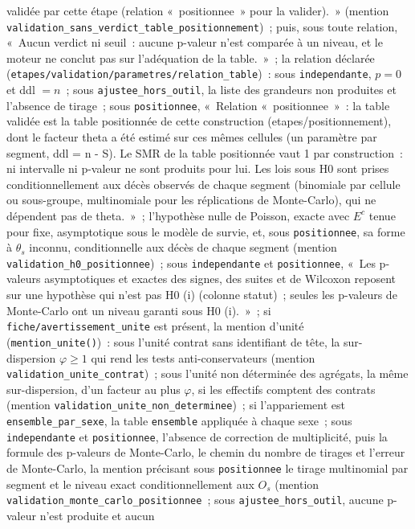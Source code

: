 \documentclass[a4paper,11pt]{article}
\newcommand{\code}[1]{\texttt{\small #1}}
\begin{document}
validée par cette étape (relation «~positionnee~» pour la valider).~»
(mention \code{validation\_sans\_verdict\_table\_positionnement})~;
puis, sous toute relation, «~Aucun verdict ni seuil~: aucune p-valeur
n'est comparée à un niveau, et le
moteur ne conclut pas sur l'adéquation de la table.~»~; la relation
déclarée (\code{etapes/validation/parametres/relation\_table})~: sous
\code{independante}, $p = 0$ et ddl $= n$~; sous
\code{ajustee\_hors\_outil}, la liste des grandeurs non produites et
l'absence de tirage~; sous \code{positionnee}, «~Relation
«~positionnee~»~: la table validée est la table positionnée de cette
construction (etapes/positionnement), dont le facteur theta a été estimé
sur ces mêmes cellules (un paramètre par segment, ddl = n - S). Le SMR de
la table positionnée vaut 1 par construction~: ni intervalle ni p-valeur
ne sont produits pour lui. Les lois sous H0 sont prises conditionnellement
aux décès observés de chaque segment (binomiale par cellule ou sous-groupe,
multinomiale pour les réplications de Monte-Carlo), qui ne dépendent pas de
theta.~»~; l'hypothèse nulle de Poisson, exacte avec $E^c$
tenue pour fixe, asymptotique sous le modèle de survie, et, sous
\code{positionnee}, sa forme à $\theta_s$ inconnu, conditionnelle aux décès
de chaque segment (mention \code{validation\_h0\_positionnee})~; sous
\code{independante} et \code{positionnee}, «~Les p-valeurs asymptotiques et exactes
des signes, des suites et de Wilcoxon reposent sur une hypothèse qui n'est
pas H0 (i) (colonne statut)~; seules les p-valeurs de Monte-Carlo ont un
niveau garanti sous H0 (i).~»~; si \code{fiche/avertissement\_unite} est
présent, la mention d'unité (\code{mention\_unite()})~: sous l'unité
contrat sans identifiant de tête, la sur-dispersion
$\varphi \ge 1$ qui rend les tests anti-conservateurs (mention
\code{validation\_unite\_contrat})~; sous l'unité non déterminée des
agrégats, la même sur-dispersion, d'un facteur au plus $\varphi$, si les
effectifs comptent des contrats (mention
\code{validation\_unite\_non\_determinee})~; si l'appariement est
\code{ensemble\_par\_sexe}, la table \code{ensemble} appliquée à chaque
sexe~; sous \code{independante} et \code{positionnee}, l'absence de correction de
multiplicité, puis la formule des p-valeurs de Monte-Carlo, le chemin du
nombre de tirages et l'erreur de Monte-Carlo, la mention précisant sous
\code{positionnee} le tirage multinomial par segment et le niveau exact
conditionnellement aux $O_s$ (mention
\code{validation\_monte\_carlo\_positionnee}~; sous
\code{ajustee\_hors\_outil}, aucune p-valeur n'est produite et aucun
\end{document}
